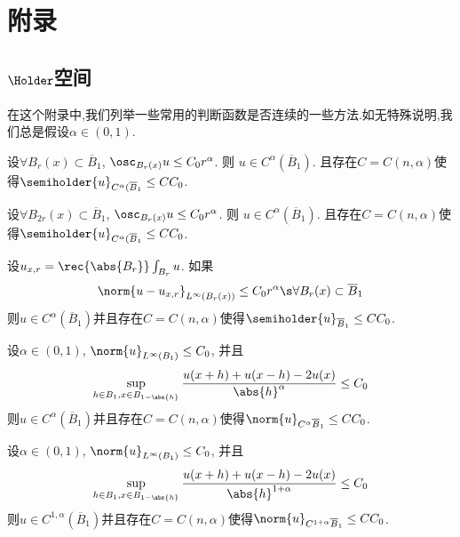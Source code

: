 \appendix
\newcommand{\BB}{{\overline{B}_1}}
\chapter{附录}
\section{\texorpdfstring{$\Holder$}{Holder}空间}
在这个附录中,我们列举一些常用的判断函数是否{\Holder}连续的一些方法.如无特殊说明,我们总是假设$\alpha \in (0,1)$.
\begin{proposition}
    设$\forall B_r(x) \subset \overline{B}_1$, $\osc_{B_r(x)}u \le C_0r^\alpha$. 则 $u \in C^\alpha(\overline{B}_1)$. 且存在$C=C(n,\alpha)$使得$\semiholder{u}_{C^\alpha(\overline{B}_1} \le CC_0$.
\end{proposition}

\begin{proposition}
    设$\forall B_{2r}(x) \subset \overline{B}_1$, $\osc_{B_r(x)}u \le C_0r^\alpha$. 则 $u \in C^\alpha(\overline{B}_1)$. 且存在$C=C(n,\alpha)$使得$\semiholder{u}_{C^\alpha(\overline{B}_1} \le CC_0$.
\end{proposition}

\begin{proposition}
    设$u_{x,r}=\rec{\abs{B_r}}\int_{B_r}u$. 如果
    \begin{equation}
        \norm{u-u_{x,r}}_{L^\infty(B_r(x))} \le C_0r^\alpha \s \forall B_r(x) \subset \overline{B}_1
    \end{equation}
    则$u \in C^\alpha(\overline{B}_1)$并且存在$C=C(n,\alpha)$使得$\semiholder{u}_{\BB}\le CC_0$.
\end{proposition}
\begin{proposition}
    设$\alpha \in (0,1)$, $\norm{u}_{L^\infty(B_1)} \le C_0$, 并且
    \begin{equation}
        \sup_{h\in B_1, x\in B_{1-\abs{h}}} \frac{u(x+h)+u(x-h)-2u(x)}{\abs{h}^\alpha} \le C_0
    \end{equation}
    则$u \in C^\alpha(\BB)$并且存在$C=C(n,\alpha)$使得$\norm{u}_{C^\alpha{\BB}} \le CC_0$.
\end{proposition}

\begin{proposition}
    设$\alpha \in (0,1)$, $\norm{u}_{L^\infty(B_1)} \le C_0$, 并且
    \begin{equation}
        \sup_{h\in B_1, x\in B_{1-\abs{h}}} \frac{u(x+h)+u(x-h)-2u(x)}{\abs{h}^{1+\alpha}} \le C_0
    \end{equation}
    则$u \in C^{1,\alpha}(\BB)$并且存在$C=C(n,\alpha)$使得$\norm{u}_{C^{1+\alpha}{\BB}} \le CC_0$.
\end{proposition}

